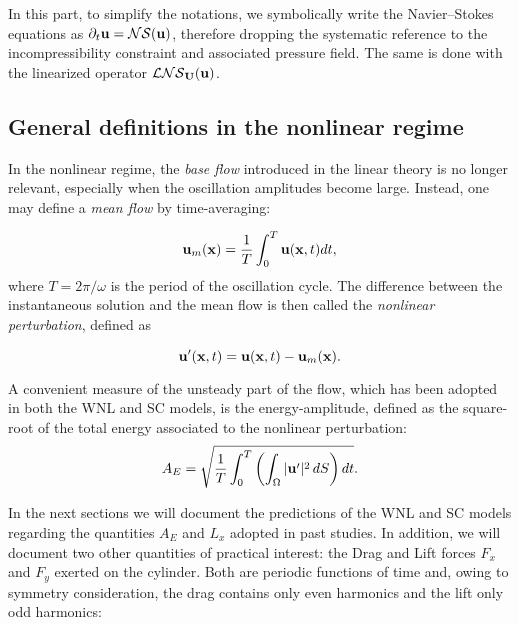 \documentclass[twocolumn,10pt]{asme2ej}
\newcommand{\be}[1]{ \begin{equation} \label{#1}}
\newcommand{\ee}{\end{equation}}
\begin{document}
 In this part, to simplify the notations, we symbolically write the Navier--Stokes equations as $\partial_t {\bf u} = {\cal NS} ({\bf u})$, therefore dropping the systematic reference to the incompressibility constraint and associated pressure field.
The same is done with the linearized operator ${\cal LNS}_{{\bf U}}( {\bf u})$. 

\subsection{General definitions in the nonlinear regime}

In the nonlinear regime, the {\em base flow} introduced in the linear theory is no longer relevant, especially when the oscillation amplitudes become large. 
Instead, one may define a {\em mean flow} by time-averaging: 

\be{defumean}
{\bf u}_m({\bf x})  = \frac{1}{T} \int_0^{T}  {\bf u}({\bf x},t)  dt,
\ee
where $T = 2\pi/\omega$  is the period of the oscillation cycle. The difference between the instantaneous solution and the mean flow is then called the {\em nonlinear perturbation}, defined as 

\be{defuprime}
{\bf u}'({\bf x},t) =   {\bf u}({\bf x},t)-  {\bf u}_m({\bf x}).
\ee

A convenient measure of the unsteady part of the flow, which has been adopted in both the WNL and SC models, is the energy-amplitude, defined as the square-root of the total energy associated to the nonlinear perturbation:
\be{defAnergy}
A_E = \sqrt{\frac{1}{T} \int_0^{T} \left( \int_\Omega | {\bf u}' |^2 \, dS \right) dt}.
\ee

In the next sections we will document the predictions of the WNL and SC models regarding the quantities $A_E$ and $L_x$ adopted in past studies.
In addition, we will document two other quantities of practical interest: the Drag and Lift forces $F_x$ and $F_y$ exerted on the cylinder. 
Both are periodic functions of time and, owing to symmetry consideration, the drag contains only even harmonics and the lift only odd harmonics:
\end{document}
